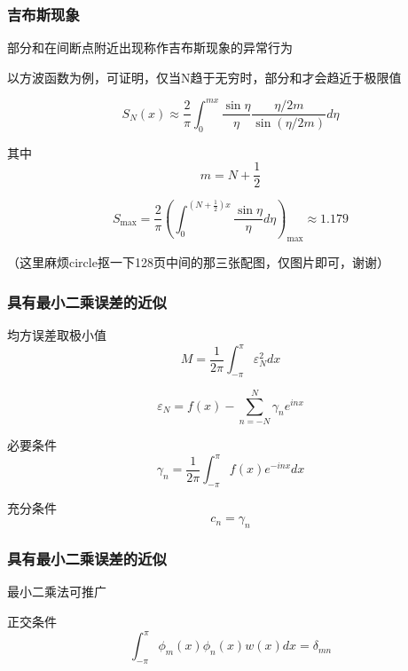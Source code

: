 \documentclass{beamer}
\begin{document}
\begin{CJK}{UTF8}{song}
\begin{frame}[allowframebreaks]
\frametitle{吉布斯现象}

部分和在间断点附近出现称作吉布斯现象的异常行为

以方波函数为例，可证明，仅当N趋于无穷时，部分和才会趋近于极限值

\begin{equation}
S_{N}(x) \approx \frac{2}{\pi} \int_{0}^{m x} \frac{\sin \eta}{\eta} \frac{\eta / 2 m}{\sin (\eta / 2 m)} d \eta
\end{equation}

其中
\begin{equation}
m=N+\frac{1}{2}
\end{equation}

\begin{equation}
S_{\max }=\frac{2}{\pi}\left(\int_{0}^{\left(N+\frac{1}{2}\right) x} \frac{\sin \eta}{\eta} d \eta\right)_{\max } \approx 1.179
\end{equation}

（这里麻烦circle抠一下128页中间的那三张配图，仅图片即可，谢谢）
\end{frame}

\begin{frame}[allowframebreaks]
\frametitle{具有最小二乘误差的近似}

均方误差取极小值
\begin{equation}
M=\frac{1}{2 \pi} \int_{-\pi}^{\pi} \varepsilon_{N}^{2} d x
\end{equation}

\begin{equation}
\varepsilon_{N}=f(x)-\sum_{n=-N}^{N} \gamma_{n} e^{i n x}
\end{equation}

必要条件
\begin{equation}
\gamma_{n}=\frac{1}{2 \pi} \int_{-\pi}^{\pi} f(x) e^{-i n x} d x
\end{equation}

充分条件
\begin{equation}
c_{n}=\gamma_{n}
\end{equation}
\end{frame}

\begin{frame}[allowframebreaks]
\frametitle{具有最小二乘误差的近似}

最小二乘法可推广

正交条件
\begin{equation}
\int_{-\pi}^{\pi} \phi_{m}(x) \phi_{n}(x) w(x) d x=\delta_{m n}
\end{equation}


\end{frame}
\end{CJK}
\end{document}
